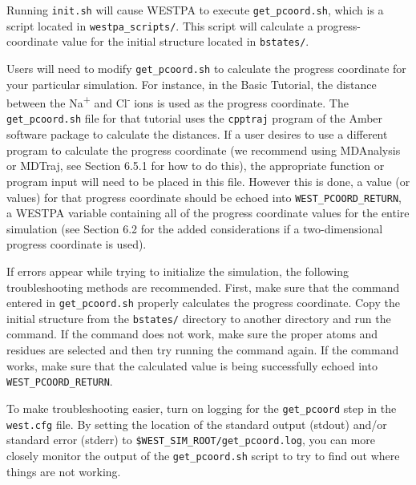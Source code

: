 \documentclass[9pt,tutorial]{livecoms}
\begin{document}
Running \verb|init.sh| will cause WESTPA to execute \verb|get_pcoord.sh|, which is a script located in \verb|westpa_scripts/|. 
This script will calculate a progress-coordinate value for the initial structure located in \verb|bstates/|. 

Users will need to modify \verb|get_pcoord.sh| to calculate the progress coordinate for your particular simulation. 
For instance, in the Basic Tutorial, the distance between the Na\textsuperscript{+} and Cl\textsuperscript{-} ions is used as the progress coordinate. 
The \verb|get_pcoord.sh| file for that tutorial uses the \verb|cpptraj| program of the Amber software package to calculate the distances. 
If a user desires to use a different program to calculate the progress coordinate (we recommend using MDAnalysis or MDTraj, see Section 6.5.1 for how to do this), the appropriate function or program input will need to be placed in this file. 
However this is done, a value (or values) for that progress coordinate should be echoed into \verb|WEST_PCOORD_RETURN|, a WESTPA variable containing all of the progress coordinate values for the entire simulation (see Section 6.2 for the added considerations if a two-dimensional progress coordinate is used).

If errors appear while trying to initialize the simulation, the following troubleshooting methods are recommended. 
First, make sure that the command entered in \verb|get_pcoord.sh| properly calculates the progress coordinate. 
Copy the initial structure from the \verb|bstates/| directory to another directory and run the command. 
If the command does not work, make sure the proper atoms and residues are selected and then try running the command again. 
If the command works, make sure that the calculated value is being successfully echoed into \verb|WEST_PCOORD_RETURN|.

To make troubleshooting easier, turn on logging for the \verb|get_pcoord| step in the \verb|west.cfg| file. 
By setting the location of the standard output (stdout) and/or standard error (stderr) to \verb|$WEST_SIM_ROOT/get_pcoord.log|, you can more closely monitor the output of the \verb|get_pcoord.sh| script to try to find out where things are not working.
\end{document}

